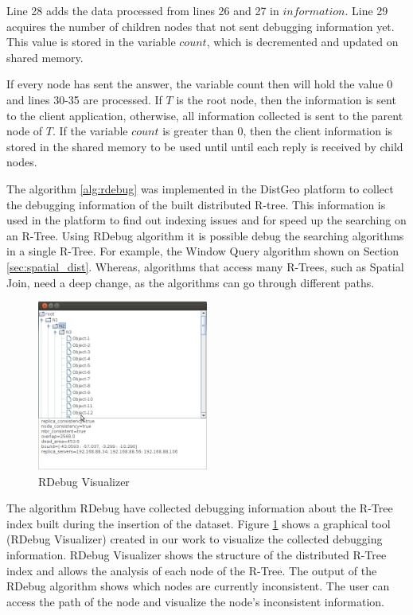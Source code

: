 Line 28 adds the data processed from lines 26 and 27 in $information$. Line 29 acquires the number of children nodes that not sent debugging information yet. 
This value is stored in the variable $count$, which is decremented and updated on shared memory.
	
If every node has sent the answer, the variable count then will hold the value 0 and lines 30-35 are processed. 
If $T$ is the root node, then the information is sent to the client application, otherwise, all information collected is sent to the parent node of $T$. 
If the variable $count$ is greater than 0, then the client information is stored in the shared memory to be used until until each reply is received by child nodes.
	
The algorithm \ref{alg:rdebug} was implemented in the DistGeo platform to collect the debugging information of the built distributed R-tree. 
This information is used in the platform to find out indexing issues and for speed up the searching on an R-Tree.
Using RDebug algorithm it is possible debug the searching algorithms in a single R-Tree. 
For example, the Window Query algorithm shown on Section \ref{sec:spatial_dist}. 
Whereas, algorithms that access many R-Trees, such as Spatial Join, need a deep change, as the algorithms can go through different paths.

\begin{figure}[ht]
  \centering
  \includegraphics[width=0.5\textwidth]{rdebug-vis.jpg}
  \caption{RDebug Visualizer}
  \label{fig:rdebug-vis}
\end{figure}

The algorithm RDebug have collected debugging information about the R-Tree index built during the insertion of the dataset.
Figure \ref{fig:rdebug-vis} shows a graphical tool (RDebug Visualizer) created in our work to visualize the collected debugging information.
RDebug Visualizer shows the structure of the distributed R-Tree index and allows the analysis of each node of the R-Tree.
The output of the RDebug algorithm shows which nodes are currently inconsistent.
The user can access the path of the node and visualize the node's inconsistent information.    